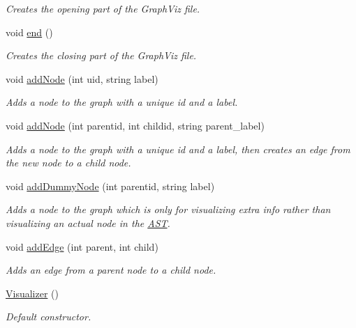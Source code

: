\begin{DoxyCompactItemize}
\begin{DoxyCompactList}\small\item\em Creates the opening part of the Graph\-Viz file. \end{DoxyCompactList}\item 
\hypertarget{classVisualizer_a89da5b4fd09be3beac4c49067fa5cd73}{void \hyperlink{classVisualizer_a89da5b4fd09be3beac4c49067fa5cd73}{end} ()}\label{classVisualizer_a89da5b4fd09be3beac4c49067fa5cd73}

\begin{DoxyCompactList}\small\item\em Creates the closing part of the Graph\-Viz file. \end{DoxyCompactList}\item 
void \hyperlink{classVisualizer_a07370d04b5c04c37c001094d8dea1a19}{add\-Node} (int uid, string label)
\begin{DoxyCompactList}\small\item\em Adds a node to the graph with a unique id and a label. \end{DoxyCompactList}\item 
void \hyperlink{classVisualizer_a24387730bdf8579f07ef7760b5c4fe83}{add\-Node} (int parentid, int childid, string parent\-\_\-label)
\begin{DoxyCompactList}\small\item\em Adds a node to the graph with a unique id and a label, then creates an edge from the new node to a child node. \end{DoxyCompactList}\item 
void \hyperlink{classVisualizer_a135921c797363c4778a16ba0b0ee5e93}{add\-Dummy\-Node} (int parentid, string label)
\begin{DoxyCompactList}\small\item\em Adds a node to the graph which is only for visualizing extra info rather than visualizing an actual node in the \hyperlink{classAST}{A\-S\-T}. \end{DoxyCompactList}\item 
void \hyperlink{classVisualizer_a84454739e84577863200833d99de5976}{add\-Edge} (int parent, int child)
\begin{DoxyCompactList}\small\item\em Adds an edge from a parent node to a child node. \end{DoxyCompactList}\item 
\hyperlink{classVisualizer_a104487003c9fea602e26c072aae27efc}{Visualizer} ()
\begin{DoxyCompactList}\small\item\em Default constructor. \end{DoxyCompactList}\item 

\end{DoxyCompactItemize}
